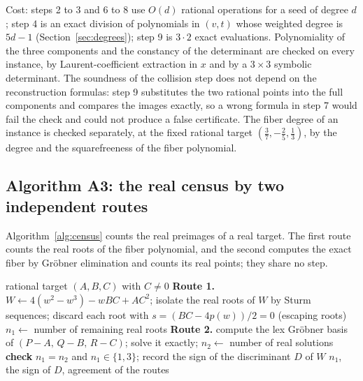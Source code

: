 \documentclass[11pt]{article}
\theoremstyle{definition}
\theoremstyle{remark}
\begin{document}
Cost: steps 2 to 3 and 6 to 8 use $O(d)$ rational operations for a seed of degree $d$; step 4 is an exact division of polynomials in $(v,t)$ whose
weighted degree is $5d - 1$ (Section~\ref{sec:degrees}); step 9 is $3\cdot 2$ exact evaluations. Polynomiality of the three components and the
constancy of the determinant are checked on every instance, by Laurent-coefficient extraction in $x$ and by a $3\times 3$ symbolic determinant. The soundness of the collision step does not depend on the reconstruction formulas: step 9 substitutes the two rational points into the full components and compares the images exactly, so a wrong formula in step 7 would fail the check and could not produce a false certificate. The fiber degree of an instance is checked separately, at the fixed rational target $(\tfrac37,-\tfrac25,\tfrac13)$, by the degree and the squarefreeness of the fiber polynomial.

\subsection{Algorithm A3: the real census by two independent routes}

Algorithm~\ref{alg:census} counts the real preimages of a real target. The first route counts the real roots of the fiber polynomial, and the second computes the exact
fiber by Gr\"obner elimination and counts its real points; they share no step.

\begin{algorithm}[t]
\caption{Real fiber census of $F$ over a rational target by two independent exact routes.}\label{alg:census}
\begin{algorithmic}[1]
\Require rational target $(A,B,C)$ with $C \neq 0$
\State \textbf{Route 1.} $W \gets 4(w^2 - w^3) - wBC + AC^2$; isolate the real roots of $W$ by Sturm sequences; discard each root with $s = (BC - 4p(w))/2 = 0$ (escaping roots)
\State $n_1 \gets$ number of remaining real roots
\State \textbf{Route 2.} compute the lex Gr\"obner basis of $(P - A,\, Q - B,\, R - C)$; solve it exactly; $n_2 \gets$ number of real solutions
\State \textbf{check} $n_1 = n_2$ and $n_1 \in \{1, 3\}$; record the sign of the discriminant $D$ of $W$
\Ensure $n_1$, the sign of $D$, agreement of the routes
\end{algorithmic}
\end{algorithm}
\end{document}
